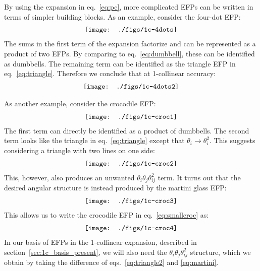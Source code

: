 \documentclass[a4paper,11pt]{article}
\newcommand{\eq}[1]{eq.~\eqref{eq:#1}}
\newcommand{\eqs}[2]{eqs.~\eqref{eq:#1} and \eqref{eq:#2}}
\renewcommand{\sec}[1]{section~\ref{sec:#1}}
\begin{document}
By using the expansion in \eq{pc}, more complicated EFPs can be written in terms of simpler building blocks.
%
As an example, consider the four-dot EFP:
\begin{align}\centering
 \texttt{[image: ./figs/1c-4dots]} \raisetag{2.4\baselineskip}    
\end{align}
The sums in the first term of the expansion factorize and can be represented as a product of two EFPs.
%
By comparing to \eq{dumbbell}, these can be identified as dumbbells. The remaining term can be identified as the triangle EFP in \eq{triangle}.
%
Therefore we conclude that at 1-collinear accuracy:
\begin{align} \label{eq:4dotsLL}
 \texttt{[image: ./figs/1c-4dots2]} \raisetag{1.6\baselineskip}    
\end{align}

As another example, consider the crocodile EFP:
\begin{align} \label{eq:smallcroc}
 \texttt{[image: ./figs/1c-croc1]} \raisetag{2.0\baselineskip}    
\end{align}
The first term can directly be identified as a product of dumbbells.
%
The second term looks like the triangle in \eq{triangle} except that $\theta_i \to \theta_i^2$.
%
This suggests considering a triangle with two lines on one side:
\begin{align}\label{eq:triangle2}
 \texttt{[image: ./figs/1c-croc2]} \raisetag{2.0\baselineskip}    
\end{align}
This, however, also produces an unwanted $\theta_i \theta_j \theta_{ij}^2$ term.
%
It turns out that the desired angular structure is instead produced by the martini glass EFP:
\begin{align} \label{eq:martini}
 \texttt{[image: ./figs/1c-croc3]} \raisetag{2.0\baselineskip}    
\end{align}
This allows us to write the crocodile EFP in \eq{smallcroc} as:
\begin{align} \label{eq:smallcrocLL}
 \texttt{[image: ./figs/1c-croc4]} \raisetag{2.4\baselineskip}    
\end{align}
In our basis of EFPs in the 1-collinear expansion, described in \sec{1c_basis_present}, we will also need the $\theta_i \theta_j \theta_{ij}^2$ structure, which we obtain by taking the difference of \eqs{triangle2}{martini}.
\end{document}
